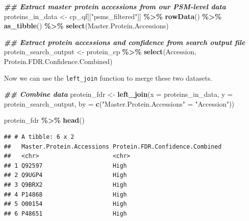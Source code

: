 \documentclass[9pt,a4paper,]{extarticle}
\newenvironment{Shaded}{\begin{snugshade}}{\end{snugshade}}
\newcommand{\AttributeTok}[1]{\textcolor[rgb]{0.13,0.29,0.53}{#1}}
\newcommand{\DocumentationTok}[1]{\textcolor[rgb]{0.56,0.35,0.01}{\textbf{\textit{#1}}}}
\newcommand{\FunctionTok}[1]{\textcolor[rgb]{0.13,0.29,0.53}{\textbf{#1}}}
\newcommand{\NormalTok}[1]{#1}
\newcommand{\OtherTok}[1]{\textcolor[rgb]{0.56,0.35,0.01}{#1}}
\newcommand{\SpecialCharTok}[1]{\textcolor[rgb]{0.81,0.36,0.00}{\textbf{#1}}}
\newcommand{\StringTok}[1]{\textcolor[rgb]{0.31,0.60,0.02}{#1}}
\begin{document}
\begin{Shaded}
\begin{Highlighting}[]
\DocumentationTok{\#\# Extract master protein accessions from our PSM{-}level data}
\NormalTok{proteins\_in\_data }\OtherTok{\textless{}{-}}\NormalTok{ cp\_qf[[}\StringTok{"psms\_filtered"}\NormalTok{]] }\SpecialCharTok{\%\textgreater{}\%}
  \FunctionTok{rowData}\NormalTok{() }\SpecialCharTok{\%\textgreater{}\%}
  \FunctionTok{as\_tibble}\NormalTok{() }\SpecialCharTok{\%\textgreater{}\%}
  \FunctionTok{select}\NormalTok{(Master.Protein.Accessions)}

\DocumentationTok{\#\# Extract protein accessions and confidence from search output file}
\NormalTok{protein\_search\_output }\OtherTok{\textless{}{-}}\NormalTok{ protein\_cp }\SpecialCharTok{\%\textgreater{}\%}
  \FunctionTok{select}\NormalTok{(Accession, Protein.FDR.Confidence.Combined)}
\end{Highlighting}
\end{Shaded}

Now we can use the \texttt{left\_join} function to merge these two datasets.

\begin{Shaded}
\begin{Highlighting}[]
\DocumentationTok{\#\# Combine data}
\NormalTok{protein\_fdr }\OtherTok{\textless{}{-}} \FunctionTok{left\_join}\NormalTok{(}\AttributeTok{x =}\NormalTok{ proteins\_in\_data, }
                         \AttributeTok{y =}\NormalTok{ protein\_search\_output, }
                         \AttributeTok{by =} \FunctionTok{c}\NormalTok{(}\StringTok{"Master.Protein.Accessions"} \OtherTok{=} \StringTok{"Accession"}\NormalTok{))}

\NormalTok{protein\_fdr }\SpecialCharTok{\%\textgreater{}\%}
  \FunctionTok{head}\NormalTok{()}
\end{Highlighting}
\end{Shaded}

\begin{verbatim}
## # A tibble: 6 x 2
##   Master.Protein.Accessions Protein.FDR.Confidence.Combined
##   <chr>                     <chr>                          
## 1 Q92597                    High                           
## 2 Q9UGP4                    High                           
## 3 Q9BRX2                    High                           
## 4 P14868                    High                           
## 5 O00154                    High                           
## 6 P48651                    High
\end{verbatim}
\end{document}
